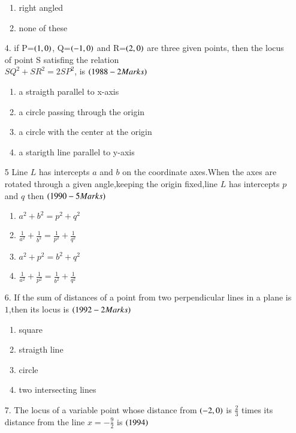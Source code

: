 \documentclass[journal,12pt,onecolumn]{IEEEtran}
\theoremstyle{remark}
\begin{document}
\begin{enumerate}
\begin{enumerate}
     \item right angled
     \item none of these
\end{enumerate}
\item[4.] if P=$\left(1,0\right)$, Q=$\left(-1,0\right)$ and R=$\left(2,0\right)$ are three given points, then the locus of point S satisfing the relation\\$SQ^2+SR^2=2SP^2$, is 
\hfill{$\left(1988-2 Marks\right)$}
\begin{enumerate}
    \item a straigth parallel to x-axis
    \item a circle passing through the origin
    \item a circle with the center at the origin 
    \item a starigth line parallel to y-axis 
\end{enumerate}
\item[5] Line $L$ has intercepts $a$ and $b$ on the coordinate axes.When the axes are rotated through a given angle,keeping the origin fixed,line $L$ has intercepts $p$ and $q$ then
\hfill{$\left(1990-5 Marks\right)$}
\begin{enumerate}
    
    \item $a^2+b^2=p^2+q^2$
    \item $\frac{1}{a^2}+\frac{1}{b^2}=\frac{1}{p^2}+\frac{1}{q^2}$
    \item $a^2+p^2=b^2+q^2$
    \item $\frac{1}{a^2}+\frac{1}{p^2}=\frac{1}{b^2}+\frac{1}{q^2}$
    
\end{enumerate}
\item[6.] If the sum of distances of a point from two perpendicular lines in a plane is $1$,then its locus is
\hfill{$\left(1992-2 Marks\right)$}
\begin{enumerate}
    
        \item square
        \item straigth line
        \item circle
        \item two intersecting lines
    
\end{enumerate}
\item[7.] The locus of a variable point whose distance from $\left(-2,0\right)$ is $\frac{2}{3}$ times its distance from the line $x=-\frac{9}{2}$ is
\hfill{$\left(1994\right)$}
\begin{enumerate}
    

\end{enumerate}
\end{enumerate}
\end{document}
